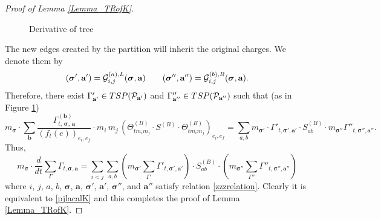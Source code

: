 \documentclass[10pt,reqno]{article}
\theoremstyle{plain} %
\theoremstyle{remark}
\numberwithin{equation}{section}
\begin{document}
\begin{proof}[Proof of Lemma \ref{Lemma_TRofK}]
\begin{figure}[h!]
{\begin{minipage}{0.45\textwidth}
  

   \end{minipage}
 
}
  \caption{Derivative of tree}
    \label{fig:hexagons}
\end{figure}

 
 
The new edges created by the partition will inherit the original charges. We denote them by 
\begin{equation}
\label{zzzrelation}
(\boldsymbol{\sigma}', \textbf{a}')= {\cal G}^{(a), L}_{i, j}(\boldsymbol{\sigma}, \textbf{a}) \quad\quad 
(\boldsymbol{\sigma}'', \textbf{a}'')={\cal G}^{(b), R}_{i, j}(\boldsymbol{\sigma}, \textbf{a}).
\end{equation}
Therefore, there exist 
$\Gamma'_{\textbf{a}'}\in TSP({\cal P}_{\textbf{a}'})$ and $ \Gamma''_{\textbf{a}''}\in TSP({\cal P}_{\textbf{a}''})$  such that (as in Figure \ref{fig:hexagons})
$$
  m_{\boldsymbol{\sigma}}\cdot \sum_{\textbf{b}}\frac{\Gamma^{(\textbf{b})}_{t, \,\boldsymbol{\sigma}
       ,\, \textbf{a}}}{\left(f_t(e)\right)_{e_i,e_f}} 
       \cdot m_i \,m_j \,\left(\Theta^{(B)}_{t m_i m_j} \cdot S^{(B)} \cdot \Theta^{(B)}_{t m_i m_j}\right)_{e_i,e_f}     = \sum_{a, b} 
        m_{\boldsymbol{\sigma}'}\cdot \Gamma'_{t, \boldsymbol{\sigma}', \textbf{a}'} \cdot S^{(B)}_{ab} \cdot 
         m_{\boldsymbol{\sigma}''}\Gamma''_{t, \boldsymbol{\sigma}'', \textbf{a}''}.
$$
Thus,
$$
 m_{\boldsymbol{\sigma}}\cdot \frac{d}{dt} \sum_{\Gamma} \Gamma_{t, \boldsymbol{\sigma}, \textbf{a}} = \sum_{i < j} \sum_{a, b} \left(m_{\boldsymbol{\sigma}'}\sum_{\Gamma'} \Gamma'_{t, \boldsymbol{\sigma}', \textbf{a}'}\right) \cdot S^{(B)}_{ab} \cdot \left(m_{\boldsymbol{\sigma}''}\sum_{\Gamma''} \Gamma''_{t, \boldsymbol{\sigma}'', \textbf{a}''}\right)
$$
where $i$, $j$, $a$, $b$, $\boldsymbol{\sigma}$, $\textbf{a}$, $\boldsymbol{\sigma}'$, $\textbf{a}'$, $\boldsymbol{\sigma}''$, and $\textbf{a}''$ satisfy relation \eqref{zzzrelation}. Clearly it is equivalent to \eqref{pjlacalK} and this completes the proof of Lemma  \ref{Lemma_TRofK}.  

 \end{proof}
\end{document}
